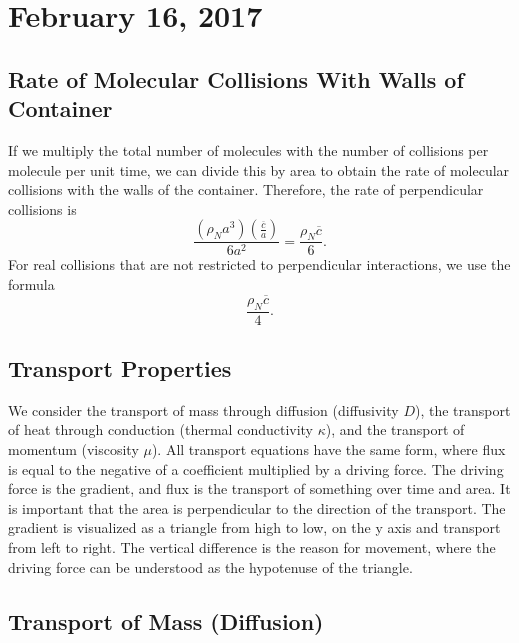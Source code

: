 \documentclass[11pt]{article}
\theoremstyle{plain} %
\theoremstyle{definition}
\theoremstyle{example}
\theoremstyle{remark}
\begin{document}
	
	
\section{February 16, 2017}
\subsection{Rate of Molecular Collisions With Walls of Container}

If we multiply the total number of molecules with the number of collisions per molecule per unit time, we can divide this by area to obtain the rate of molecular collisions with the walls of the container. Therefore, the rate of perpendicular collisions is 
$$\frac{\left(\rho_N a^3\right)\left(\frac{\overline{c}}{a}\right)}{6a^2} = \frac{\rho_N\overline{c}}{6}.$$ For real collisions that are not restricted to perpendicular interactions, we use the formula
$$\frac{\rho_N \overline{c}}{4}.$$

\subsection{Transport Properties}

We consider the transport of mass through diffusion (diffusivity $D$), the transport of heat through conduction (thermal conductivity $\kappa$), and the transport of momentum (viscosity $\mu$). All transport equations have the same form, where flux is equal to the negative of a coefficient multiplied by a driving force. The driving force is the gradient, and flux is the transport of something over time and area. It is important that the area is perpendicular to the direction of the transport. The gradient is visualized as a triangle from high to low, on the y axis and transport from left to right. The vertical difference is the reason for movement, where the driving force can be understood as the hypotenuse of the triangle. 

\subsection{Transport of Mass (Diffusion)}
\end{document}
